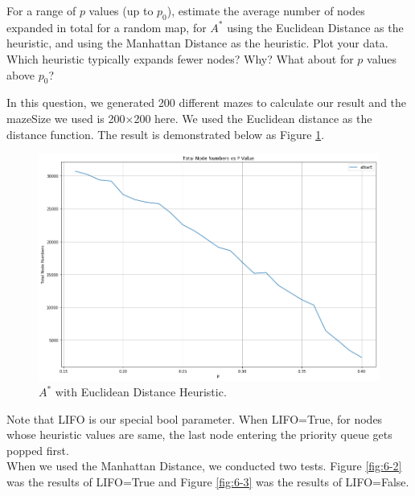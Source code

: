 \documentclass[letter]{article}
\begin{document}
\begin{questions}
	
	\item {For a range of $ p $ values (up to $ p_0 $), estimate the average number of nodes expanded in total for a random map, for $ A^* $ using the Euclidean Distance as the heuristic, and using the Manhattan Distance as the heuristic. Plot your data. Which heuristic typically expands fewer nodes? Why? What about for $ p $ values above $ p_0 $?}
	
	In this question, we generated 200 different mazes to calculate our result and the mazeSize we used is 200×200 here. We used the Euclidean distance as the distance function. The result is demonstrated below as Figure \ref{fig:6-1}. \\
	
	\begin{figure}
		\centering
		\includegraphics[width=\textwidth]{../pics/question6-1.png}
		\caption{\label{fig:6-1} $ A^* $ with Euclidean Distance Heuristic.}
	\end{figure}
	
	Note that LIFO is our special bool parameter. When LIFO=True, for nodes whose heuristic values are same, the last node entering the priority queue gets popped first. \\
	
	When we used the Manhattan Distance, we conducted two tests. Figure \ref{fig:6-2} was the results of LIFO=True and Figure \ref{fig:6-3} was the results of LIFO=False. \\
	

\end{questions}
\end{document}
